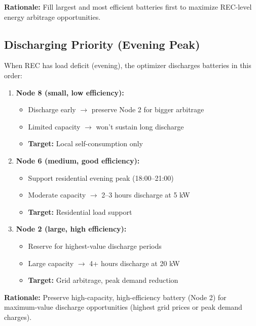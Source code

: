 \documentclass[11pt,a4paper]{article}
\begin{document}
\textbf{Rationale:} Fill largest and most efficient batteries first to maximize REC-level energy arbitrage opportunities.

\subsection{Discharging Priority (Evening Peak)}

When REC has load deficit (evening), the optimizer discharges batteries in this order:

\begin{enumerate}
    \item \textbf{Node 8 (small, low efficiency):}
        \begin{itemize}
            \item Discharge early $\rightarrow$ preserve Node 2 for bigger arbitrage
            \item Limited capacity $\rightarrow$ won't sustain long discharge
            \item \textbf{Target:} Local self-consumption only
        \end{itemize}
    
    \item \textbf{Node 6 (medium, good efficiency):}
        \begin{itemize}
            \item Support residential evening peak (18:00--21:00)
            \item Moderate capacity $\rightarrow$ 2--3 hours discharge at 5 kW
            \item \textbf{Target:} Residential load support
        \end{itemize}
    
    \item \textbf{Node 2 (large, high efficiency):}
        \begin{itemize}
            \item Reserve for highest-value discharge periods
            \item Large capacity $\rightarrow$ 4+ hours discharge at 20 kW
            \item \textbf{Target:} Grid arbitrage, peak demand reduction
        \end{itemize}
\end{enumerate}

\textbf{Rationale:} Preserve high-capacity, high-efficiency battery (Node 2) for maximum-value discharge opportunities (highest grid prices or peak demand charges).
\end{document}
